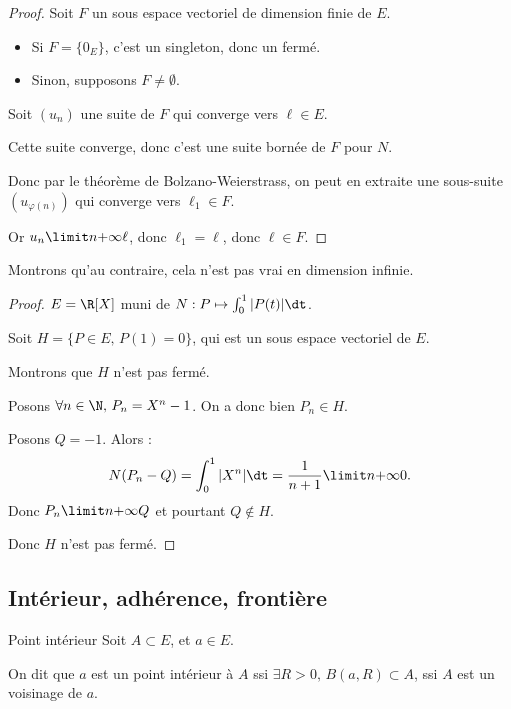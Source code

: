 \begin{proof}
    Soit $F$ un sous espace vectoriel de dimension finie de $E$. 
    \begin{itemize}
        \item Si $F = \{0_E\}$, c'est un singleton, donc un fermé.
        \item Sinon, supposons $F \neq \emptyset$. 
    \end{itemize}

    Soit $(u_n)$ une suite de $F$ qui converge vers $\ell \in E$.

    Cette suite converge, donc c'est une suite bornée de $F$ pour $N$. 

    Donc par le théorème de Bolzano-Weierstrass, on peut en extraite une sous-suite $(u_{\varphi(n)})$ qui converge vers
    $\ell_1 \in F$.

    Or $u_n \limit n {+ \infty} \ell$, donc $\ell_1 = \ell$, donc $\ell \in F$.
\end{proof}

Montrons qu'au contraire, cela n'est pas vrai en dimension infinie.

\begin{proof}
    $E = \R [X]$ muni de $N: P \mapsto \int_{0}^1 |P(t)| \dt$.

    Soit $H = \{P \in E, \, P(1) = 0\}$, qui est un sous espace vectoriel de $E$.

    Montrons que $H$ n'est pas fermé.

    Posons $\forall n \in \N, \, P_n = X^n - 1$. On a donc bien $P_n \in H$.

    Posons $Q = -1$. Alors :
    \[N(P_n - Q ) = \int_0^1 |X^n| \dt = \frac 1 {n+1} \limit n {+ \infty} 0.\]
    Donc $P_n \limit n {+ \infty} Q$ et pourtant $Q \not \in H$.

    Donc $H$ n'est pas fermé.
\end{proof}

\subsection{Intérieur, adhérence, frontière}

\begin{definition}{Point intérieur}{}
    Soit $A \subset E$, et $a \in E$.

    On dit que $a$ est un point intérieur à $A$ ssi $\exists R > 0, \, B(a, R) \subset A$,
    ssi $A$ est un voisinage de $a$. 
\end{definition}

